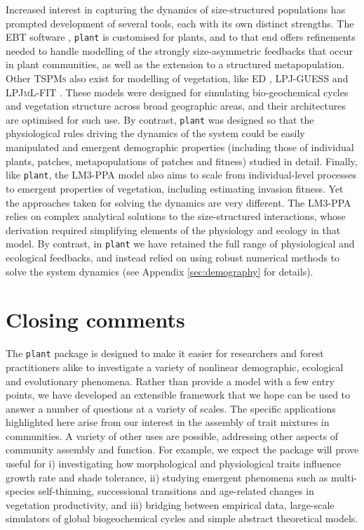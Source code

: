 \documentclass[a4paper,11pt]{article}
\newcommand{\plant}{\texttt{plant}}
\begin{document}
Increased interest in capturing the dynamics of size-structured populations
\citep[e.g.][]{Griffith-2016}
has prompted development of several tools, each with its own distinct
strengths. The \textsc{EBT} software \citep{Deroos-1997}, {\plant} is customised for plants, and
to that end offers refinements needed to handle modelling of the strongly
size-asymmetric feedbacks that occur in plant communities, as well as the
extension to a structured metapopulation. Other \textsc{TSPMs} also exist for modelling of vegetation, like \textsc{ED}
\citep[ver 1 and 2;][]{Moorcroft-2001, Medvigy-2009}, \textsc {LPJ-GUESS}
\citep{Smith-2014} and \textsc{LPJmL-FIT} \citep{Sakschewski-2015}. These
models were designed for simulating bio-geochemical cycles and vegetation
structure across broad geographic areas, and their architectures are
optimised for such use. By contrast, {\plant} was designed so that the
physiological rules driving the dynamics of the system could be easily
manipulated and emergent demographic properties (including those of individual plants, patches, metapopulations of patches and fitness) studied in
detail. Finally, like {\plant}, the \textsc{LM3-PPA} \cite{Weng-2015} model also aims
to scale from individual-level processes to emergent properties of
vegetation, including estimating invasion fitness. Yet the approaches taken
for solving the dynamics are very different. The \textsc{LM3-PPA} relies on
complex analytical solutions to the size-structured interactions, whose
derivation required simplifying elements of the physiology and ecology in that
model. By contrast, in {\plant} we have retained the full range of
physiological and ecological feedbacks, and instead relied on using robust
numerical methods to solve the system dynamics (see Appendix
\ref{sec:demography} for details).

\section{Closing comments}

The {\plant} package is designed to make it easier for researchers and forest
practitioners alike to investigate a variety of nonlinear demographic, ecological and evolutionary
phenomena. Rather than provide a model with a few entry points, we
have developed an extensible framework that we hope can be used to
answer a number of questions at a variety of scales. The specific
applications highlighted here arise from our interest in the assembly of
trait mixtures in communities. A variety of other uses are
possible, addressing other aspects of community assembly and function. For
example, we expect the package will prove useful for i) investigating
how morphological and physiological traits influence growth rate and
shade tolerance, ii) studying emergent phenomena such as multi-species self-thinning, successional transitions and age-related changes in
vegetation productivity, and iii) bridging between empirical data,
large-scale simulators of global biogeochemical cycles and simple
abstract theoretical models.
\end{document}

